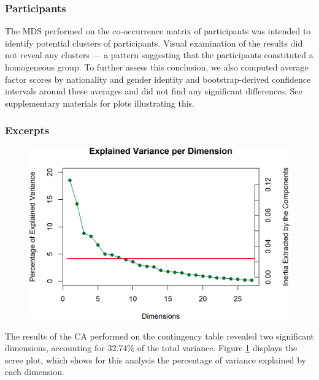 \documentclass[
  english,
  man,floatsintext]{apa6}
\begin{document}
\hypertarget{participants-1}{%
\subsubsection{Participants}\label{participants-1}}

The MDS performed on the co-occurrence matrix of participants was intended to identify potential clusters of participants. Visual examination of the results did not reveal any clusters --- a pattern suggesting that the participants constituted a homogeneous group. To further assess this conclusion, we also computed average factor scores by nationality and gender identity and bootstrap-derived confidence intervals around these averages and did not find any significant differences. See supplementary materials for plots illustrating this.

\hypertarget{excerpts}{%
\subsubsection{Excerpts}\label{excerpts}}

\begin{figure}  
  \begin{center}
    \includegraphics{./Music-Descriptor-Space_files/figure-latex/scree4excerptsq-1.png}
  \caption{ }\label{fig:scree4excerptsq}  
 \end{center}
\end{figure}

The results of the CA performed on the contingency table revealed two significant dimensions, accounting for 32.74\% of the total variance. Figure \ref{fig:scree4excerptsq} displays the scree plot, which shows for this analysis the percentage of variance explained by each dimension.
\end{document}
